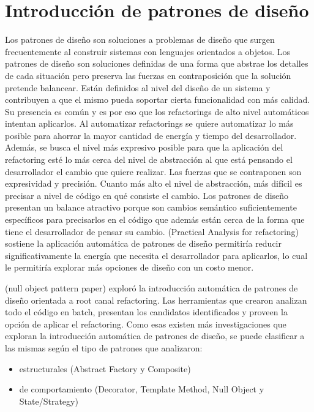 \section{Introducción de patrones de diseño}
Los patrones de diseño son soluciones a problemas de diseño que surgen frecuentemente al construir
sistemas con lenguajes orientados a objetos. Los patrones de diseño son soluciones definidas de una
forma que abstrae los detalles de cada situación pero preserva las fuerzas en contraposición que la
solución pretende balancear. Están definidos al nivel del diseño de un sistema y contribuyen a que
el mismo pueda soportar cierta funcionalidad con más calidad. Su presencia es común y es por eso que
los refactorings de alto nivel automáticos intentan aplicarlos. Al automatizar refactorings se
quiere automatizar lo más posible para ahorrar la mayor cantidad de energía y tiempo del
desarrollador. Además, se busca el nivel más expresivo posible para que la aplicación del
refactoring esté lo más cerca del nivel de abstracción al que está pensando el desarrollador el
cambio que quiere realizar. Las fuerzas que se contraponen son expresividad y precisión. Cuanto más alto el nivel de
abstracción, más difícil es precisar a nivel de código en qué consiste el cambio. Los patrones de
diseño presentan un balance atractivo porque son cambios semántico suficientemente específicos para
precisarlos en el código que además están cerca de la forma que tiene el desarrollador de pensar su
cambio.
(Practical Analysis for refactoring) sostiene la aplicación automática de patrones de diseño
permitiría reducir significativamente la energía que necesita el desarrollador para aplicarlos, lo
cual le permitiría explorar más opciones de diseño con un costo menor.

(null object pattern paper) exploró la introducción automática de patrones de diseño orientada a root canal
refactoring. Las herramientas que crearon analizan todo el código en batch, presentan los candidatos
identificados y proveen la opción de aplicar el refactoring. Como esas existen más investigaciones
que exploran la introducción automática de patrones de diseño, se puede clasificar a las mismas
según el tipo de patrones que analizaron:

\begin{itemize}
    \item estructurales (Abstract Factory y Composite)
    \item de comportamiento (Decorator, Template Method, Null Object y State/Strategy)
\end{itemize}

